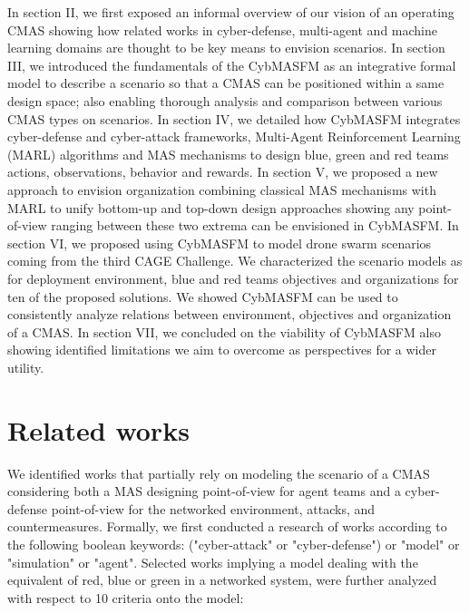 \documentclass[conference]{IEEEtran}
\begin{document}


In section II, we first exposed an informal overview of our vision of an operating CMAS showing how related works in cyber-defense, multi-agent and machine learning domains are thought to be key means to envision scenarios.
In section III, we introduced the fundamentals of the CybMASFM as an integrative formal model to describe a scenario so that a CMAS can be positioned within a same design space; also enabling thorough analysis and comparison between various CMAS types on scenarios.
In section IV, we detailed how CybMASFM integrates cyber-defense and cyber-attack frameworks, Multi-Agent Reinforcement Learning (MARL) algorithms and MAS mechanisms to design blue, green and red teams actions, observations, behavior and rewards.
In section V, we proposed a new approach to envision organization combining classical MAS mechanisms with MARL to unify bottom-up and top-down design approaches showing any point-of-view ranging between these two extrema can be envisioned in CybMASFM.
In section VI, we proposed using CybMASFM to model drone swarm scenarios coming from the third CAGE Challenge\cite{cage_challenge_3_announcement}. We characterized the scenario models as for deployment environment, blue and red teams objectives and organizations for ten of the proposed solutions. We showed CybMASFM can be used to consistently analyze relations between environment, objectives and organization of a CMAS.
In section VII, we concluded on the viability of CybMASFM also showing identified limitations we aim to overcome as perspectives for a wider utility.


\section{Related works}

We identified works that partially rely on modeling the scenario of a CMAS considering both a MAS designing point-of-view for agent teams and a cyber-defense point-of-view for the networked environment, attacks, and countermeasures. Formally, we first conducted a research of works according to the following boolean keywords: ("cyber-attack" or "cyber-defense") or "model" or "simulation" or "agent". Selected works implying a model dealing with the equivalent of red, blue or green in a networked system, were further analyzed with respect to 10 criteria onto the model:
\end{document}
